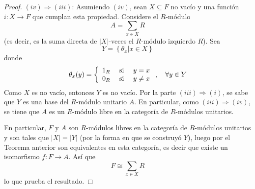 \documentclass[12pt]{report}
\newcounter{it}
\theoremstyle{largebreak}
\newcommand\abs[1]{\ensuremath{\big|#1\big|}}
\newcommand\cf[3]{\ensuremath{#1:#2\rightarrow#3}}
\begin{document}
\begin{proof}
        $(iv)\Rightarrow(iii)$: Asumiendo $(iv)$, sean $X\subseteq F$ no vacío y una función $\cf{i}{X}{F}$ que cumplan esta propiedad. Considere el $R$-módulo
        \begin{equation*}
            A=\sum_{ x\in X}R
        \end{equation*}
        (es decir, es la suma directa de $\abs{X}$-veces el $R$-módulo izquierdo $R$). Sea
        \begin{equation*}
            Y=\left\{\theta_x\Big| x\in X \right\}
        \end{equation*}
        donde
        \begin{equation*}
            \theta_x(y)=\left\{
                \begin{array}{lcr}
                    1_R & \textup{ si } & y=x\\
                    0_R & \textup{ si } & y\neq x\\
                \end{array}
            \right.,\quad\forall y\in Y
        \end{equation*}
        Como $X$ es no vacío, entonces $Y$ es no vacío. Por la parte $(iii)\Rightarrow(i)$, se sabe que $Y$ es una base del $R$-módulo unitario $A$. En particular, como $(iii)\Rightarrow(iv)$, se tiene que $A$ es un $R$-módulo libre en la categoría de $R$-módulos unitarios.
        
        En particular, $F$ y $A$ son $R$-módulos libres en la categoría de $R$-módulos unitarios y son tales que $\abs{X}=\abs{Y}$ (por la forma en que se construyó $Y$), luego por el Teorema anterior son equivalentes en esta categoría, es decir que existe un isomorfismo $\cf{f}{F}{A}$. Así que
        \begin{equation*}
            F\cong\sum_{ x\in X}R
        \end{equation*}
        lo que prueba el resultado.
    \end{proof}
\end{document}
